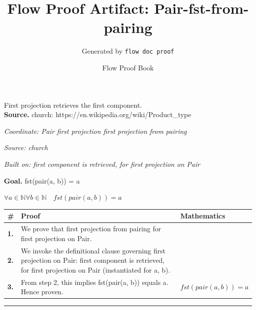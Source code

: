 \documentclass[11pt]{article}
\title{Flow Proof Artifact: Pair-fst-from-pairing}
\author{Generated by \texttt{flow doc proof}}
\date{Flow Proof Book}
\theoremstyle{definition}
\begin{document}
\maketitle
First projection retrieves the first component.\\[0.5em]
\textbf{Source.} church: https://en.wikipedia.org/wiki/Product\_type\\[0.5em]
\bigskip
{}\par
\smallskip\noindent\textit{Coordinate: Pair \cdot first projection \cdot first projection from pairing}\par
\smallskip\noindent\textit{Source: church}\par
\smallskip\noindent\textit{Built on: first component is retrieved, for first projection on Pair}\par
\medskip
\noindent\textbf{Goal.} fst(pair(a, b)) = a\par
\noindent$\displaystyle \forall a \in \mathbb{N} \forall b \in \mathbb{N}\quad fst(pair(a, b)) = a$\par
\medskip
\noindent
\begin{tabular}{@{} >{\raggedright\arraybackslash}p{} >{\raggedright\arraybackslash}p{} >{\raggedleft\arraybackslash}p{} @{}}
\textbf{\#} & \textbf{Proof} & \textbf{Mathematics} \\
\midrule
\textbf{1.} & We prove that first projection from pairing for first projection on Pair. & \\[0.45em]
\textbf{2.} & We invoke the definitional clause governing first projection on Pair: first component is retrieved, for first projection on Pair (instantiated for a, b). & \\[0.45em]
\textbf{3.} & From step 2, this implies fst(pair(a, b)) equals a. Hence proven. & $\displaystyle fst(pair(a, b)) = a$ \\[0.45em]
\bottomrule
\end{tabular}
\label{thm:Pair-first projection-first_projection_from_pairing}
\par\medskip\hrule
\end{document}
